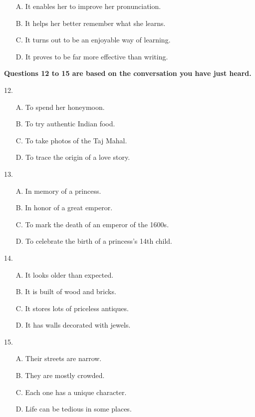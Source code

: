 \documentclass[UTF8,11pt]{ctexart}
\begin{document}
\begin{itemize}[leftmargin=2em,itemsep=.2em,topsep=.4em]\item[A.] It enables her to improve her pronunciation.
\item[B.] It helps her better remember what she learns.
\item[C.] It turns out to be an enjoyable way of learning.
\item[D.] It proves to be far more effective than writing.
\end{itemize}

\textbf{Questions 12 to 15 are based on the conversation you have just heard.}


12.


\begin{itemize}[leftmargin=2em,itemsep=.2em,topsep=.4em]\item[A.] To spend her honeymoon.
\item[B.] To try authentic Indian food.
\item[C.] To take photos of the Taj Mahal.
\item[D.] To trace the origin of a love story.
\end{itemize}

13.


\begin{itemize}[leftmargin=2em,itemsep=.2em,topsep=.4em]\item[A.] In memory of a princess.
\item[B.] In honor of a great emperor.
\item[C.] To mark the death of an emperor of the 1600s.
\item[D.] To celebrate the birth of a princess’s 14th child.
\end{itemize}

14.


\begin{itemize}[leftmargin=2em,itemsep=.2em,topsep=.4em]\item[A.] It looks older than expected.
\item[B.] It is built of wood and bricks.
\item[C.] It stores lots of priceless antiques.
\item[D.] It has walls decorated with jewels.
\end{itemize}

15.


\begin{itemize}[leftmargin=2em,itemsep=.2em,topsep=.4em]\item[A.] Their streets are narrow.
\item[B.] They are mostly crowded.
\item[C.] Each one has a unique character.
\item[D.] Life can be tedious in some places.
\end{itemize}
\end{document}
